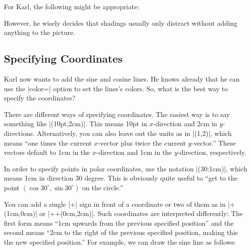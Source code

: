 For Karl, the following might be appropriate:

\begin{codeexample}[]
\end{codeexample}

However, he wisely decides that shadings usually only distract without
adding anything to the picture.


\subsection{Specifying Coordinates}

Karl now wants to add the sine and cosine lines. He knows already that
he can use the |color=| option to set the lines's colors. So, what is
the best way to specify the coordinates?

There are different ways of specifying coordinates. The easiest way is
to say something like |(10pt,2cm)|. This means 10pt in $x$-direction
and 2cm in $y$-directions. Alternatively, you can also leave out the
units as in |(1,2)|, which means ``one times the current $x$-vector
plus twice the current $y$-vector.'' These vectors default to 1cm in
the $x$-direction and 1cm in the $y$-direction, respectively.

In order to specify points in polar coordinates, use the notation
|(30:1cm)|, which means 1cm in direction 30 degree. This is obviously
quite useful to ``get to the point $(\cos 30^\circ,\sin 30^\circ)$ on
the circle.'' 

You can add a single |+| sign in front of a coordinate or two of
them as in |+(1cm,0cm)| or |++(0cm,2cm)|. Such coordinates are interpreted
differently: The first form means ``1cm upwards from the previous
specified position'' and the second means ``2cm to the right of the
previous specified position, making this the new specified position.''
For example, we can draw the sine line as follows:

\begin{codeexample}[]
\end{codeexample}

